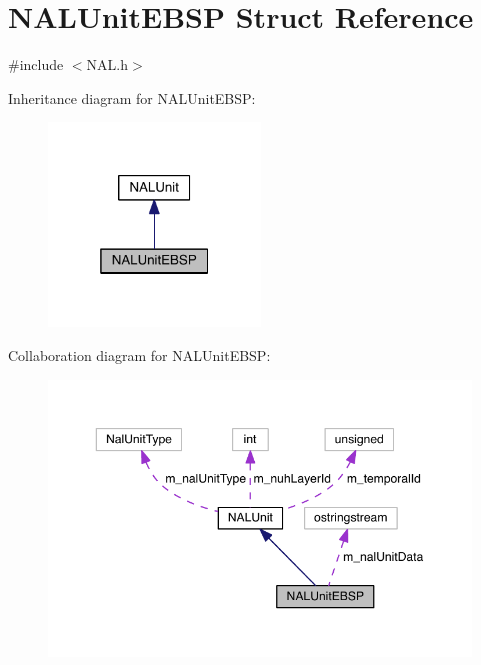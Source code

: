 \hypertarget{struct_n_a_l_unit_e_b_s_p}{}\section{N\+A\+L\+Unit\+E\+B\+SP Struct Reference}
\label{struct_n_a_l_unit_e_b_s_p}


{\ttfamily \#include $<$N\+A\+L.\+h$>$}



Inheritance diagram for N\+A\+L\+Unit\+E\+B\+SP\+:
\nopagebreak
\begin{figure}[H]
\begin{center}
\leavevmode
\includegraphics[width=160pt]{d6/d0f/struct_n_a_l_unit_e_b_s_p__inherit__graph}
\end{center}
\end{figure}


Collaboration diagram for N\+A\+L\+Unit\+E\+B\+SP\+:
\nopagebreak
\begin{figure}[H]
\begin{center}
\leavevmode
\includegraphics[width=350pt]{df/dcd/struct_n_a_l_unit_e_b_s_p__coll__graph}
\end{center}
\end{figure}
